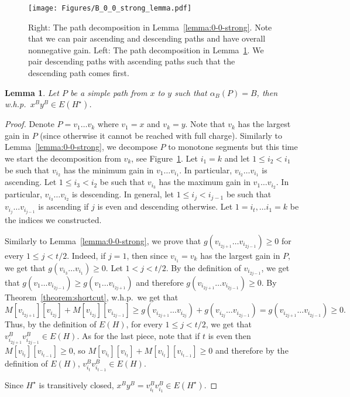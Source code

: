 \documentclass[11pt]{article}
\newtheorem{lemma}[theorem]{Lemma}
\begin{document}
\begin{figure}
    \centering
\texttt{[image: Figures/B\_0\_0\_strong\_lemma.pdf]}
\caption{Right: The path decomposition in Lemma~\ref{lemma:0-0-strong}. Note that we can pair ascending and descending paths and have overall nonnegative gain. Left: The path decomposition in Lemma~\ref{lemma:B-B-strong}. We pair descending paths with ascending paths such that the descending path comes first.}
\label{fig:path-zig-zag-decomposition}
\end{figure}



\begin{lemma}\label{lemma:B-B-strong}
Let $P$ be a simple path from $x$ to $y$ such that $\alpha_B(P)= B$, then w.h.p.\ $x^B y^B \in E(H^\star)$.    
\end{lemma}

\begin{proof}
    Denote $P = v_1 \ldots v_k$ where $v_1 = x$ and $v_k = y$.
    Note that $v_k$ has the largest gain in $P$ (since otherwise it cannot be reached with full charge). Similarly to Lemma~\ref{lemma:0-0-strong}, we decompose $P$ to monotone segments but this time we start the decomposition from $v_k$, see Figure~\ref{fig:path-zig-zag-decomposition}. Let $i_1=k$ and let $1\le i_2<i_1$ be such that $v_{i_2}$ has the minimum gain in $v_1\ldots v_{i_1}$. In particular, $v_{i_2} \ldots v_{i_1}$ is ascending. Let $1\le i_3<i_2$ be such that $v_{i_3}$ has the maximum gain in $v_1\ldots v_{i_2}$. In particular, $v_{i_3} \ldots v_{i_2}$ is descending.
    In general, let $1\le i_{j} < i_{j-1}$ be such that  $v_{i_{j}} \ldots v_{i_{j-1}}$ is ascending if $j$ is even and descending otherwise. Let $1=i_t,\ldots i_1=k$ be the indices we constructed.

    Similarly to Lemma~\ref{lemma:0-0-strong}, we prove that 
    $g(v_{i_{2j+1}}\ldots v_{i_{2j-1}}) \ge 0$  for every $1\le j < t/2$. Indeed, if $j=1$, then since $v_{i_1}=v_k$ has the largest gain in $P$, we get that $g(v_{i_{3}}\ldots v_{i_{1}}) \ge 0$. Let $1< j < t/2$. By the definition of $v_{i_{2j-1}}$, we get that $g(v_1\ldots v_{i_{2j-1}}) \ge g(v_1\ldots v_{i_{2j+1}}) $ and therefore $g(v_{i_{2j+1}}\ldots v_{i_{2j-1}}) \ge 0$.
    By Theorem~\ref{theorem:shortcut}, w.h.p.\ we get that 
    $$M[v_{i_{2j+1}}][v_{i_{2j}}] + M[v_{i_{2j}}][v_{i_{2j-1}}] 
    \ge g(v_{i_{2j+1}}\ldots v_{i_{2j}}) 
    +
    g(v_{i_{2j}}\ldots v_{i_{2j-1}})
    = g(v_{i_{2j+1}}\ldots v_{i_{2j-1}}) \ge 0.$$ 
    Thus, by the definition of $E(H)$, for every $1 \le j < t/2$, we get that $v_{i_{2j+1}}^B v_{i_{2j-1}}^B \in E(H)$. As for the last piece, note that if $t$ is even then $M[v_{i_t}][v_{i_{t-1}}] \ge 0$, so $M[v_{i_t}][v_{i_t}] + M[v_{i_t}][v_{i_{t-1}}] \ge 0$  and therefore by the definition of $E(H)$, $v_{i_t}^B v_{i_{t-1}}^B \in E(H)$. 
    
    Since $H^\star$ is transitively closed, $x^B y^B = v_{i_t}^B v_{i_1}^B \in E(H^\star)$. 
\end{proof}
\end{document}
